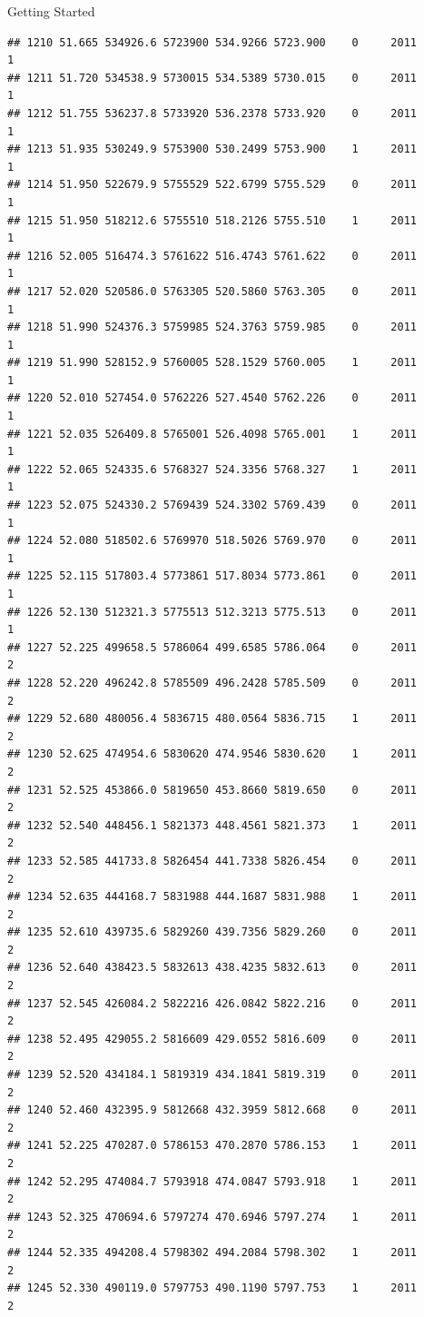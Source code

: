 \documentclass[
  ignorenonframetext,
]{beamer}
\begin{document}
\begin{frame}[fragile]{Getting Started}
\begin{verbatim}
## 1210 51.665 534926.6 5723900 534.9266 5723.900    0     2011        1
## 1211 51.720 534538.9 5730015 534.5389 5730.015    0     2011        1
## 1212 51.755 536237.8 5733920 536.2378 5733.920    0     2011        1
## 1213 51.935 530249.9 5753900 530.2499 5753.900    1     2011        1
## 1214 51.950 522679.9 5755529 522.6799 5755.529    0     2011        1
## 1215 51.950 518212.6 5755510 518.2126 5755.510    1     2011        1
## 1216 52.005 516474.3 5761622 516.4743 5761.622    0     2011        1
## 1217 52.020 520586.0 5763305 520.5860 5763.305    0     2011        1
## 1218 51.990 524376.3 5759985 524.3763 5759.985    0     2011        1
## 1219 51.990 528152.9 5760005 528.1529 5760.005    1     2011        1
## 1220 52.010 527454.0 5762226 527.4540 5762.226    0     2011        1
## 1221 52.035 526409.8 5765001 526.4098 5765.001    1     2011        1
## 1222 52.065 524335.6 5768327 524.3356 5768.327    1     2011        1
## 1223 52.075 524330.2 5769439 524.3302 5769.439    0     2011        1
## 1224 52.080 518502.6 5769970 518.5026 5769.970    0     2011        1
## 1225 52.115 517803.4 5773861 517.8034 5773.861    0     2011        1
## 1226 52.130 512321.3 5775513 512.3213 5775.513    0     2011        1
## 1227 52.225 499658.5 5786064 499.6585 5786.064    0     2011        2
## 1228 52.220 496242.8 5785509 496.2428 5785.509    0     2011        2
## 1229 52.680 480056.4 5836715 480.0564 5836.715    1     2011        2
## 1230 52.625 474954.6 5830620 474.9546 5830.620    1     2011        2
## 1231 52.525 453866.0 5819650 453.8660 5819.650    0     2011        2
## 1232 52.540 448456.1 5821373 448.4561 5821.373    1     2011        2
## 1233 52.585 441733.8 5826454 441.7338 5826.454    0     2011        2
## 1234 52.635 444168.7 5831988 444.1687 5831.988    1     2011        2
## 1235 52.610 439735.6 5829260 439.7356 5829.260    0     2011        2
## 1236 52.640 438423.5 5832613 438.4235 5832.613    0     2011        2
## 1237 52.545 426084.2 5822216 426.0842 5822.216    0     2011        2
## 1238 52.495 429055.2 5816609 429.0552 5816.609    0     2011        2
## 1239 52.520 434184.1 5819319 434.1841 5819.319    0     2011        2
## 1240 52.460 432395.9 5812668 432.3959 5812.668    0     2011        2
## 1241 52.225 470287.0 5786153 470.2870 5786.153    1     2011        2
## 1242 52.295 474084.7 5793918 474.0847 5793.918    1     2011        2
## 1243 52.325 470694.6 5797274 470.6946 5797.274    1     2011        2
## 1244 52.335 494208.4 5798302 494.2084 5798.302    1     2011        2
## 1245 52.330 490119.0 5797753 490.1190 5797.753    1     2011        2

\end{verbatim}
\end{frame}
\end{document}
